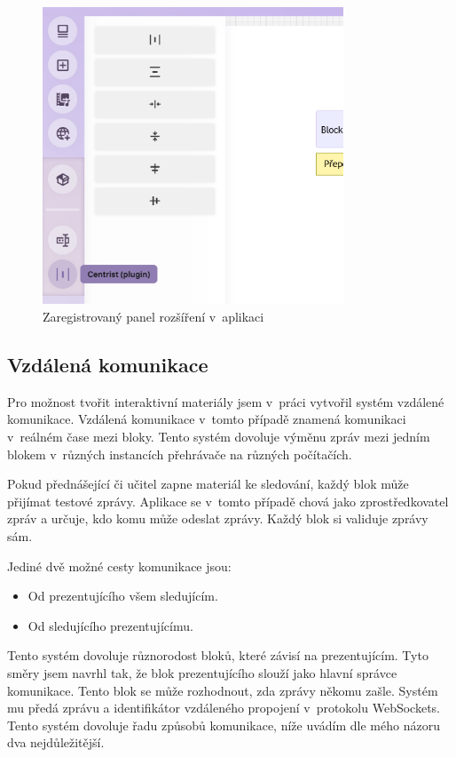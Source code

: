 \begin{figure}[ht!]
    \centering
    \includegraphics[width=0.8\textwidth]{media/05_realizace/panel.png}
    \caption{Zaregistrovaný panel rozšíření v~aplikaci}
    \label{fig:realizace/panel}
\end{figure}

\subsection{Vzdálená komunikace}\label{text:realizace/vzdalenaKomunikace}

Pro možnost tvořit interaktivní materiály jsem v~práci vytvořil systém vzdálené komunikace.
Vzdálená komunikace v~tomto případě znamená komunikaci v~reálném čase mezi bloky.
Tento systém dovoluje výměnu zpráv mezi jedním blokem v~různých instancích přehrávače na různých počítačích.

Pokud přednášející či učitel zapne materiál ke sledování, každý blok může přijímat testové zprávy.
Aplikace se v~tomto případě chová jako zprostředkovatel zpráv a určuje, kdo komu může odeslat zprávy.
Každý blok si validuje zprávy sám.

Jediné dvě možné cesty komunikace jsou:

\begin{itemize}
    \item Od prezentujícího všem sledujícím.
    \item Od sledujícího prezentujícímu.
\end{itemize}

Tento systém dovoluje různorodost bloků, které závisí na prezentujícím.
Tyto směry jsem navrhl tak, že blok prezentujícího slouží jako hlavní správce komunikace.
Tento blok se může rozhodnout, zda zprávy někomu zašle.
Systém mu předá zprávu a identifikátor vzdáleného propojení v~protokolu WebSockets.
Tento systém dovoluje řadu způsobů komunikace, níže uvádím dle mého názoru dva nejdůležitější.

